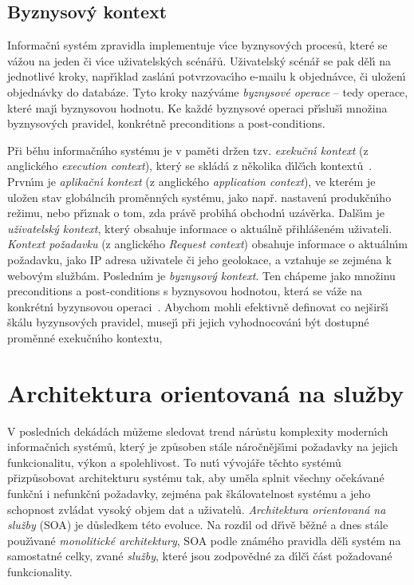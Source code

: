 \subsection{Byznysov\'y kontext}

Informačn\'{\i} systém zpravidla implementuje v\'{\i}ce byznysov\'ych procesů, které se vážou
na jeden či v\'{\i}ce uživatelsk\'ych scénářů. Uživatelsk\'y scénář se pak děl\'{\i} na jednotlivé
kroky, např\'{\i}klad zaslán\'{\i} potvrzovac\'{\i}ho e-mailu k objednávce, či uložen\'{\i} objednávky
do databáze. Tyto kroky naz\'yváme \textit{byznysové operace} – tedy operace, které maj\'{\i}
byznysovou hodnotu. Ke každé byznysové operaci př\'{\i}sluš\'{\i} množina byznysov\'ych pravidel,
konkrétně preconditions a post-conditions.

Při běhu informačn\'{\i}ho systému je v paměti držen tzv. \textit{exekučn\'{\i} kontext} (z anglického \textit{execution context}),
kter\'y se skládá z několika d\'{\i}lč\'{\i}ch kontextů~\cite{cemus2017separation}. Prvn\'{\i}m
je \textit{aplikačn\'{\i} kontext} (z anglického \textit{application context}), ve kterém je uložen stav globálnc\'{\i}h proměnn\'ych systému,
jako např. nastaven\'{\i} produkčn\'{\i}ho režimu, nebo př\'{\i}znak o tom, zda právě prob\'{\i}há obchodn\'{\i}
uzávěrka. Dalš\'{\i}m je \textit{uživatelsk\'y kontext}, kter\'y obsahuje informace o aktuálně
přihlášeném uživateli. \textit{Kontext požadavku} (z anglického \textit{Request context}) obsahuje
informace o aktuáln\'{\i}m požadavku, jako IP adresa uživatele či jeho geolokace,
a vztahuje se zejména k webov\'ym službám. Posledn\'{\i}m je \textit{byznysov\'y kontext}. Ten
chápeme jako množinu preconditions a post-conditions s byznysovou hodnotou, která se
váže na konkrétn\'{\i} byzynsovou operaci~\cite{cemus2015automated}.
Abychom mohli efektivně definovat co nejširš\'{\i} škálu byzynsov\'ych pravidel,
musej\'{\i} při jejich vyhodnocován\'{\i} b\'yt dostupné proměnné exekučn\'{\i}ho kontextu,

\section{Architektura orientovaná na služby}\label{sec:soa}

V posledn\'{\i}ch dekádách můžeme sledovat trend nárůstu komplexity
modern\'{\i}ch informačn\'{\i}ch systémů, kter\'y je způsoben stále náročnějš\'{\i}mi
požadavky na jejich funkcionalitu, v\'ykon a spolehlivost. To nut\'{\i}
v\'yvojáře těchto systémů přizpůsobovat architekturu systému tak,
aby uměla splnit všechny očekávané funkčn\'{\i} i nefunkčn\'{\i} požadavky,
zejména pak škálovatelnost systému a jeho schopnost zvládat vysok\'y
objem dat a uživatelů. \textit{Architektura orientovaná na služby} (\gls{SOA}) je
důsledkem této evoluce. Na rozd\'{\i}l od dř\'{\i}vě běžné a dnes
stále použ\'{\i}vané \textit{monolitické architektury},
\gls{SOA} podle známého pravidla 
děl\'{\i} systém na samostatné celky, zvané \textit{služby}, které jsou
zodpovědné za d\'{\i}lč\'{\i} část požadované funkcionality.

